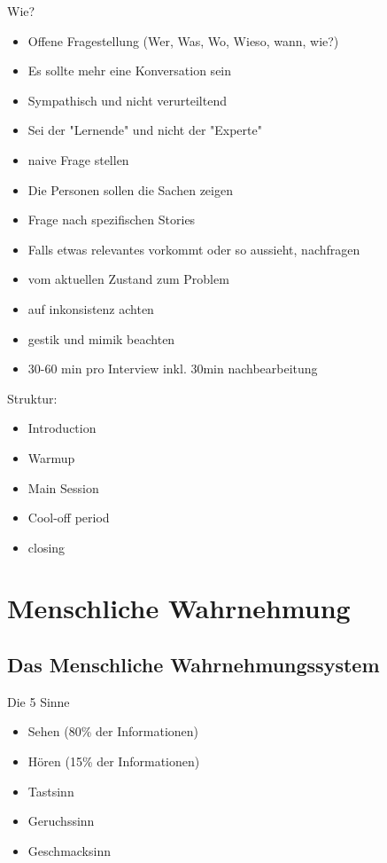 \documentclass{report}
\theoremstyle{definition}
\theoremstyle{example}
\begin{document}
Wie?
\begin{itemize}
   \item Offene Fragestellung (Wer, Was, Wo, Wieso, wann, wie?)
   \item Es sollte mehr eine Konversation sein
   \item Sympathisch und nicht verurteiltend
   \item Sei der "Lernende" und nicht der "Experte"
   \item naive Frage stellen
   \item Die Personen sollen die Sachen zeigen
   \item Frage nach spezifischen Stories
   \item Falls etwas relevantes vorkommt oder so aussieht, nachfragen
   \item vom aktuellen Zustand zum Problem
   \item auf inkonsistenz achten
   \item gestik und mimik beachten
   \item 30-60 min pro Interview inkl. 30min nachbearbeitung
\end{itemize}

Struktur:
\begin{itemize}
   \item Introduction
   \item Warmup
   \item Main Session
   \item Cool-off period
   \item closing
\end{itemize}

\chapter{Menschliche Wahrnehmung}

\section{Das Menschliche Wahrnehmungssystem}

Die 5 Sinne 
\begin{itemize}
   \item Sehen (80\% der Informationen)
   \item Hören (15\% der Informationen)
   \item Tastsinn
   \item Geruchssinn
   \item Geschmacksinn
\end{itemize}
\end{document}
